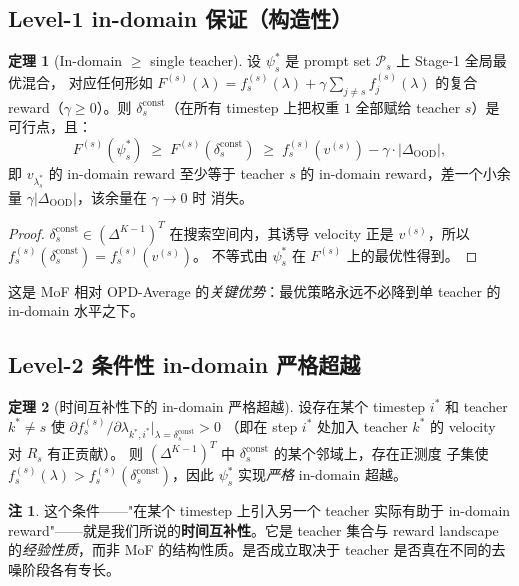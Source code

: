 \documentclass[11pt,a4paper]{article}
\newcommand{\OOD}{\mathrm{OOD}}
\newcommand{\const}{\mathrm{const}}
\theoremstyle{definition}
\newtheorem{remark}{注}
\newtheorem{theorem}{定理}
\begin{document}
\subsection{Level-1 in-domain 保证（构造性）}
\label{ssec:level1}

\begin{theorem}[In-domain $\geq$ single teacher]
\label{thm:level1}
设 $\psi^*_s$ 是 prompt set $\mathcal{P}_s$ 上 Stage-1 全局最优混合，
对应任何形如
$F^{(s)}(\lambda) = f_s^{(s)}(\lambda) + \gamma \sum_{j \neq s} f_j^{(s)}(\lambda)$
的复合 reward（$\gamma \geq 0$）。则 $\delta_s^{\const}$（在所有 timestep
上把权重 $1$ 全部赋给 teacher $s$）是可行点，且：
\begin{equation}
F^{(s)}(\psi^*_s) \;\geq\; F^{(s)}(\delta_s^{\const})
\;\geq\; f_s^{(s)}(v^{(s)}) - \gamma\cdot|\Delta_{\OOD}|,
\end{equation}
即 $v_{\lambda^*_s}$ 的 in-domain reward 至少等于 teacher $s$ 的 in-domain
reward，差一个小余量 $\gamma|\Delta_{\OOD}|$，该余量在 $\gamma \to 0$ 时
消失。
\end{theorem}

\begin{proof}
$\delta_s^{\const} \in (\Delta^{K-1})^T$ 在搜索空间内，其诱导 velocity
正是 $v^{(s)}$，所以 $f_s^{(s)}(\delta_s^{\const}) = f_s^{(s)}(v^{(s)})$。
不等式由 $\psi^*_s$ 在 $F^{(s)}$ 上的最优性得到。
\end{proof}

这是 MoF 相对 OPD-Average 的\emph{关键优势}：最优策略永远不必降到单
teacher 的 in-domain 水平之下。

\subsection{Level-2 条件性 in-domain 严格超越}
\label{ssec:level2}

\begin{theorem}[时间互补性下的 in-domain 严格超越]
\label{thm:level2}
设存在某个 timestep $i^*$ 和 teacher $k^* \neq s$ 使
$\partial f_s^{(s)} / \partial \lambda_{k^*, i^*} |_{\lambda = \delta_s^{\const}} > 0$
（即在 step $i^*$ 处加入 teacher $k^*$ 的 velocity 对 $R_s$ 有正贡献）。
则 $(\Delta^{K-1})^T$ 中 $\delta_s^{\const}$ 的某个邻域上，存在正测度
子集使 $f_s^{(s)}(\lambda) > f_s^{(s)}(\delta_s^{\const})$，因此
$\psi_s^*$ 实现\emph{严格} in-domain 超越。
\end{theorem}

\begin{remark}
这个条件——"在某个 timestep 上引入另一个 teacher 实际有助于 in-domain
reward"——就是我们所说的\textbf{时间互补性}。它是 teacher 集合与 reward
landscape 的\emph{经验性质}，而非 MoF 的结构性质。是否成立取决于
teacher 是否真在不同的去噪阶段各有专长。
\end{remark}
\end{document}
